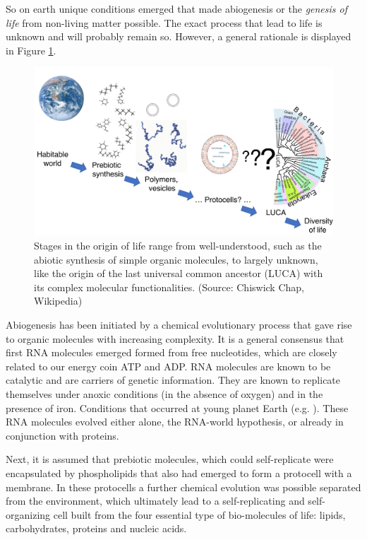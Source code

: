 \documentclass[
  11pt,
]{book}
\begin{document}
So on earth unique conditions emerged that made abiogenesis or the \emph{genesis of life} from non-living matter possible. The exact process that lead to life is unknown and will probably remain so.
However, a general rationale is displayed in Figure \ref{fig:originOfLife}.

\begin{figure}

{\centering \includegraphics[width=1\linewidth]{./figs/origin_of_life_stages} 

}

\caption{Stages in the origin of life range from well-understood, such as the abiotic synthesis of simple organic molecules, to largely unknown, like the origin of the last universal common ancestor (LUCA) with its complex molecular functionalities. (Source: Chiswick Chap, Wikipedia)}\label{fig:originOfLife}
\end{figure}

Abiogenesis has been initiated by a chemical evolutionary process that gave rise to organic molecules with increasing complexity. It is a general consensus that first RNA molecules emerged formed from free nucleotides, which are closely related to our energy coin ATP and ADP. RNA molecules are known to be catalytic and are carriers of genetic information. They are known to replicate themselves under anoxic conditions (in the absence of oxygen) and in the presence of iron. Conditions that occurred at young planet Earth (e.g. \citet{Williams2013}). These RNA molecules evolved either alone, the RNA-world hypothesis, or already in conjunction with proteins.

Next, it is assumed that prebiotic molecules, which could self-replicate were encapsulated by phospholipids that also had emerged to form a protocell with a membrane.
In these protocells a further chemical evolution was possible separated from the environment, which ultimately lead to a self-replicating and self-organizing cell built from the four essential type of bio-molecules of life: lipids, carbohydrates, proteins and nucleic acids.
\end{document}
